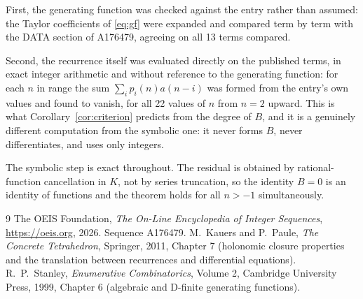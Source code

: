 \documentclass[11pt,a4paper]{article}
\theoremstyle{plain}
\theoremstyle{definition}
\begin{document}
First, the generating function was checked against the entry rather than assumed: the
Taylor coefficients of \eqref{eq:gf} were expanded and compared term by term with the DATA
section of A176479, agreeing on all 13 terms compared.

Second, the recurrence itself was evaluated directly on the published terms, in exact
integer arithmetic and without reference to the generating function: for each $n$ in range
the sum $\sum_{i}p_{i}(n)a(n-i)$ was formed from the entry's own values and found to
vanish, for all 22 values of $n$ from $n=2$ upward. This is what
Corollary~\ref{cor:criterion} predicts from the degree of $B$, and it is a genuinely
different computation from the symbolic one: it never forms $B$, never differentiates, and
uses only integers.

The symbolic step is exact throughout. The residual is obtained by rational-function
cancellation in $K$, not by series truncation, so the identity $B=0$ is an
identity of functions and the theorem holds for all $n>-1$ simultaneously.

\begin{thebibliography}{9}
 The OEIS Foundation, \emph{The On-Line Encyclopedia of Integer Sequences},
\url{https://oeis.org}, 2026. Sequence A176479.
 M.~Kauers and P.~Paule, \emph{The Concrete Tetrahedron}, Springer, 2011,
Chapter 7 (holonomic closure properties and the translation between recurrences and
differential equations).
 R.~P.~Stanley, \emph{Enumerative Combinatorics}, Volume 2, Cambridge
University Press, 1999, Chapter 6 (algebraic and D-finite generating functions).
\end{thebibliography}
\end{document}
